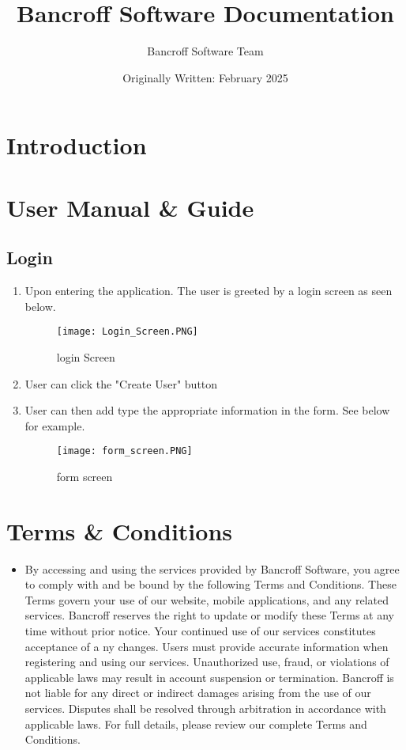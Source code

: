 \documentclass{article}
\title{Bancroff Software Documentation}
\author{Bancroff Software Team}
\date{Originally Written: February 2025}
\begin{document}
\maketitle

\section{Introduction}

\section{User Manual \& Guide}
    \subsection{Login}
        \begin{enumerate}
            \item Upon entering the application. The user is greeted by a login screen as seen below.
                \begin{figure}[h]
                \centering
                \texttt{[image: Login\_Screen.PNG]}
                \caption{login Screen}
                \end{figure}
            \item User can click the "Create User" button
            \item User can then add type the appropriate information in the form. See below for example.
                \begin{figure}[h]
                \centering
                \texttt{[image: form\_screen.PNG]}
                \caption{form screen}
                \end{figure}
        \end{enumerate}
    \section{Terms \& Conditions}
    \begin{itemize}
        \item 
        By accessing and using the services provided by Bancroff Software, 
        you agree to comply with and be bound by the following Terms and 
        Conditions. These Terms govern your use of our website, 
        mobile applications, and any related services. Bancroff reserves
         the right to update or modify these Terms at any time without prior 
         notice. Your continued use of our services constitutes acceptance of a
         ny changes. Users must provide accurate information when registering 
         and using our services. Unauthorized use, fraud, or violations of 
         applicable laws may result in account suspension or termination. 
         Bancroff is not liable for any direct or indirect damages arising from 
         the use of our services. Disputes shall be resolved through 
         arbitration in accordance with applicable laws. 
        For full details, please review our complete Terms and Conditions.
    \end{itemize} 
\end{document}
